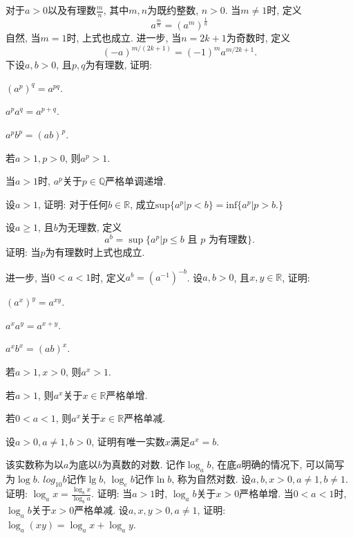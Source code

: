 \begin{quizb}
\woe 对于\(a>0\)以及有理数\(\frac{m}{n}\), 其中\(m,n\)为既约整数, \(n>0\). 当\(m\ne 1\)时, 定义\[a^{\frac{m}{n}}=\left(a^m\right)^\frac{1}{n}\]
        自然, 当\(m=1\)时, 上式也成立. 进一步, 当\(n=2k+1\)为奇数时, 定义\[(-a)^{m/(2k+1)}=(-1)^ma^{m/2k+1}.\]下设\(a,b>0\), 且\(p,q\)为有理数, 证明:
\begin{compactenum}[\quad (1)]
            \item \((a^p)^q=a^{pq}\).
            \item \(a^pa^q=a^{p+q}\).
            \item \(a^pb^p=(ab)^p\).
            \item 若\(a>1,p>0\), 则\(a^p>1\).
            \item 当\(a>1\)时, \(a^p\)关于\(p\in\mathbb{Q}\)严格单调递增.
            \item 设\(a>1\), 证明: 对于任何\(b\in\mathbb{R}\), 成立\(\mathrm{sup}\{a^p|p<b\}=\mathrm{inf}\{a^p|p>b.\}\)
\end{compactenum}
\woe 设\(a\geqslant 1\), 且\(b\)为无理数, 定义\[a^b=\sup\{a^p|p\leqslant b \text{ 且 }p\text{ 为有理数}\}.\]
证明: 当\(p\)为有理数时上式也成立. 

进一步, 当\(0<a<1\)时, 定义\(a^b=(a^{-1})^{-b}\).
\woe 设\(a,b>0\), 且\(x,y\in \mathbb{R}\), 证明:
\begin{quizcs}
\item \(\left(a^x\right)^y=a^{xy}\).
\item \(a^xa^y=a^{x+y}\).
\item \(a^xb^x=(ab)^x\).
\item 若\(a>1,x>0\), 则\(a^x>1\).
\item 若\(a>1\), 则\(a^x\)关于\(x\in \mathbb{R}\)严格单增.
\item 若\(0<a<1\), 则\(a^x\)关于\(x\in \mathbb{R}\)严格单减.
\end{quizcs}
\woe 设\(a>0,a\ne 1,b>0\), 证明有唯一实数\(x\)满足\(a^x=b\).
        
该实数称为以\(a\)为底以\(b\)为真数的对数. 记作\(\log_ab\), 在底\(a\)明确的情况下, 可以简写为\(\log b\). \(log_{10}b\)记作\(\lg b\), \(\log_eb\)记作\(\ln b\), 称为自然对数.
\woe 设\(a,b,x>0,a\ne 1,b\ne 1\). 证明: \(\log_ax=\frac{\log_bx}{\log_ba}\).
\woe 证明: 当\(a>1\)时, \(\log_ab\)关于\(x>0\)严格单增. 当\(0<a<1\)时, \(\log_ab\)关于\(x>0\)严格单减.
\woe 设\(a,x,y>0,a\ne 1\), 证明: \(\log_a(xy)=\log_ax+\log_ay\). 
\end{quizb}
